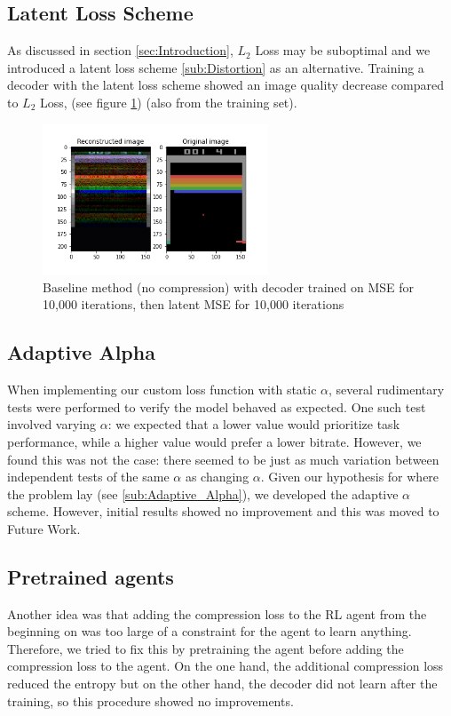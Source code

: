 \subsection{Latent Loss Scheme}
As discussed in section \ref{sec:Introduction}, $L_2$ Loss may be suboptimal and
we introduced a latent loss scheme \ref{sub:Distortion} as an alternative.
Training a decoder with the latent loss scheme showed an image quality decrease compared to $L_2$ Loss, (see figure \ref{fig:baseline_MSE_latent}) (also from the training set).

\begin{figure}[H]
    \centering
    \includegraphics[width=0.6\textwidth]{images/orig_reconstructed_rl3.0.png}
    \caption{Baseline method (no compression) with decoder trained on MSE for 10,000 iterations, then latent MSE for 10,000 iterations}
    \label{fig:baseline_MSE_latent}
\end{figure}

\subsection{Adaptive Alpha}
When implementing our custom loss function with static $\alpha$, several
rudimentary tests were performed to verify the model behaved as expected. One
such test involved varying $\alpha$: we expected that a lower value would
prioritize task performance, while a higher value would prefer a lower bitrate.
However, we found this was not the case: there seemed to be just as much
variation between independent tests of the same $\alpha$ as changing $\alpha$.
Given our hypothesis for where the problem lay (see \ref{sub:Adaptive_Alpha}),
we developed the adaptive $\alpha$ scheme. However, initial results showed no
improvement and this was moved to Future Work.

\subsection{Pretrained agents}
Another idea was that adding the compression loss to the RL agent from the
beginning on was too large of a constraint for the agent to learn anything.
Therefore, we tried to fix this by pretraining the agent before adding
the compression loss to the agent. On the one hand, the additional compression
loss reduced the entropy but on the other hand, the decoder did not learn
after the training, so this procedure showed no improvements.


